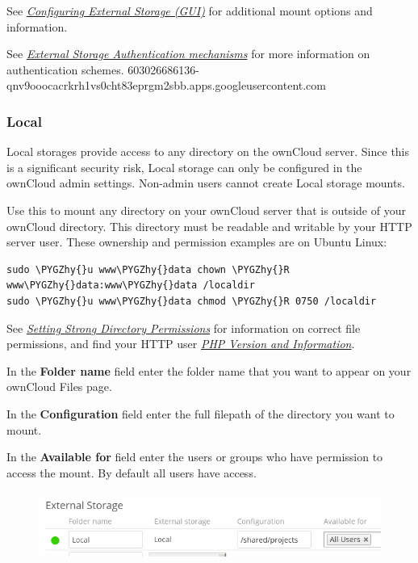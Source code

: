 \documentclass[letterpaper,10pt,english]{sphinxmanual}
\def\PYGZhy{\char`\-}
\begin{document}
See {\hyperref[configuration_files/external_storage_configuration_gui::doc]{\emph{Configuring External Storage (GUI)}}} for additional mount
options and information.

See {\hyperref[configuration_files/external_storage/auth_mechanisms::doc]{\emph{External Storage Authentication mechanisms}}} for more information on authentication schemes.
603026686136-qnv9ooocacrkrh1vs0cht83eprgm2sbb.apps.googleusercontent.com


\subsubsection{Local}
\label{configuration_files/external_storage/local:local}\label{configuration_files/external_storage/local::doc}
Local storages provide access to any directory on the ownCloud server. Since
this is a significant security risk, Local storage can only be configured in
the ownCloud admin settings. Non-admin users cannot create Local storage
mounts.

Use this to mount any directory on your ownCloud server that is outside
of your ownCloud  directory. This directory must be readable and
writable by your HTTP server user. These ownership and permission examples
are on Ubuntu Linux:

\begin{Verbatim}[commandchars=\\\{\}]
sudo \PYGZhy{}u www\PYGZhy{}data chown \PYGZhy{}R www\PYGZhy{}data:www\PYGZhy{}data /localdir
sudo \PYGZhy{}u www\PYGZhy{}data chmod \PYGZhy{}R 0750 /localdir
\end{Verbatim}

See {\hyperref[installation/installation_wizard:strong-perms-label]{\emph{Setting Strong Directory Permissions}}} for information on correct file permissions, and
find your HTTP user {\hyperref[issues/general_troubleshooting:label-phpinfo]{\emph{PHP Version and Information}}}.

In the \textbf{Folder name} field enter the folder name that you want to appear on
your ownCloud Files page.

In the \textbf{Configuration} field enter the full filepath of the directory you
want to mount.

In the \textbf{Available for} field enter the users or groups who have permission to
access the mount. By default all users have access.
\begin{figure}[htbp]
\centering

\includegraphics{local.png}
\end{figure}
\end{document}

